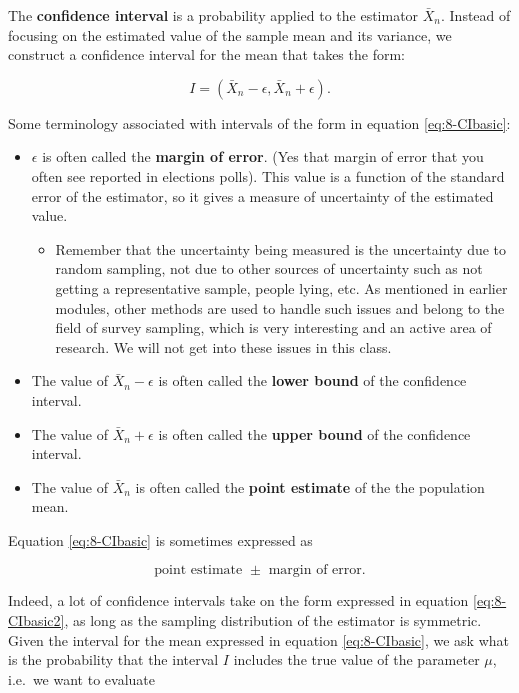 \documentclass[
]{book}
\providecommand{\tightlist}{%
  \setlength{\itemsep}{0pt}\setlength{\parskip}{0pt}}
\begin{document}
The \textbf{confidence interval} is a probability applied to the estimator \(\bar{X}_n\). Instead of focusing on the estimated value of the sample mean and its variance, we construct a confidence interval for the mean that takes the form:

\begin{equation} 
I = \left(\bar{X}_n - \epsilon, \bar{X}_n + \epsilon \right).
\label{eq:8-CIbasic}
\end{equation}

Some terminology associated with intervals of the form in equation \eqref{eq:8-CIbasic}:

\begin{itemize}
\item
  \(\epsilon\) is often called the \textbf{margin of error}. (Yes that margin of error that you often see reported in elections polls). This value is a function of the standard error of the estimator, so it gives a measure of uncertainty of the estimated value.

  \begin{itemize}
  \tightlist
  \item
    Remember that the uncertainty being measured is the uncertainty due to random sampling, not due to other sources of uncertainty such as not getting a representative sample, people lying, etc. As mentioned in earlier modules, other methods are used to handle such issues and belong to the field of survey sampling, which is very interesting and an active area of research. We will not get into these issues in this class.
  \end{itemize}
\item
  The value of \(\bar{X}_n - \epsilon\) is often called the \textbf{lower bound} of the confidence interval.
\item
  The value of \(\bar{X}_n + \epsilon\) is often called the \textbf{upper bound} of the confidence interval.
\item
  The value of \(\bar{X}_n\) is often called the \textbf{point estimate} of the the population mean.
\end{itemize}

Equation \eqref{eq:8-CIbasic} is sometimes expressed as

\begin{equation} 
\text{point estimate } \pm \text{ margin of error}.
\label{eq:8-CIbasic2}
\end{equation}

Indeed, a lot of confidence intervals take on the form expressed in equation \eqref{eq:8-CIbasic2}, as long as the sampling distribution of the estimator is symmetric. Given the interval for the mean expressed in equation \eqref{eq:8-CIbasic}, we ask what is the probability that the interval \(I\) includes the true value of the parameter \(\mu\), i.e.~we want to evaluate
\end{document}
